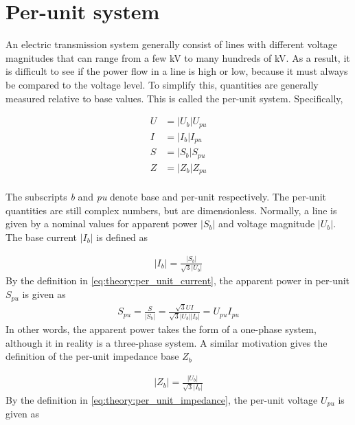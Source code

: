 \documentclass[class=book, crop=false]{standalone}
\begin{document}
\section{Per-unit system}
An electric transmission system generally consist of lines with different voltage magnitudes that can range from a few kV to many hundreds of kV. As a result, it is difficult to see if the power flow in a line is high or low, because it must always be compared to the voltage level. To simplify this, quantities are generally measured relative to base values. This is called the per-unit system. Specifically,


\begin{equation}
   \begin{aligned}\label{eq:theory:per_unit_all}
U &= |U_{b}|U_{pu} \\
I &= |I_{b}|I_{pu} \\
S &= |S_{b}|S_{pu} \\
Z &= |Z_{b}|Z_{pu} \\
\end{aligned} 
\end{equation}

The subscripts \textit{b} and \textit{pu} denote base and per-unit respectively. The per-unit quantities are still complex numbers, but are dimensionless. Normally, a line is given by a nominal values for apparent power $|S_{b}|$ and voltage magnitude $|U_{b}|$. The base current $|I_{b}|$ is defined as 

\begin{equation}
   \begin{aligned}\label{eq:theory:per_unit_current}
|I_{b}| = \frac{|S_{b}|}{\sqrt{3}|U_{b}|}
\end{aligned} 
\end{equation}
By the definition in \eqref{eq:theory:per_unit_current}, the apparent power in per-unit $S_{pu}$ is given as 
\begin{equation}
   \begin{aligned}\label{eq:theory:per_unit_power}
S_{pu} = \frac{S}{|S_{b}|}
        = \frac{\sqrt{3}UI}{\sqrt{3}|U_{b}||I_{b}|}
        = U_{pu}I_{pu}
\end{aligned} 
\end{equation}
In other words, the apparent power takes the form of a one-phase system, although it in reality is a three-phase system. A similar motivation gives the definition of the per-unit impedance base $Z_{b}$

\begin{equation}
   \begin{aligned}\label{eq:theory:per_unit_impedance}
|Z_{b}| = \frac{|U_{b}|}{\sqrt{3}|I_{b}|}
\end{aligned} 
\end{equation}
By the definition in \eqref{eq:theory:per_unit_impedance}, the per-unit voltage $U_{pu}$ is given as 
\end{document}
